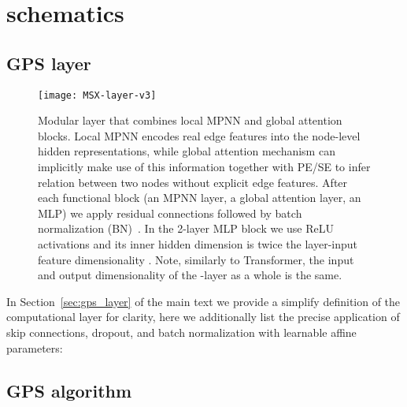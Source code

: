 \documentclass{article}
\begin{document}
\clearpage
\section{\method schematics}
\label{app:GPS-layer}
\setcounter{figure}{0}
\setcounter{table}{0}


\subsection{GPS layer}

\begin{figure}[ht]
  \centering
  \texttt{[image: MSX-layer-v3]}
  \caption{Modular \method layer that combines local MPNN and global attention blocks. Local MPNN encodes real edge features into the node-level hidden representations, while global attention mechanism can implicitly make use of this information together with PE/SE to infer relation between two nodes without explicit edge features. After each functional block (an MPNN layer, a global attention layer, an MLP) we apply residual connections followed by batch normalization (BN)~\cite{ioffe2015batchnorm}. In the 2-layer MLP block we use ReLU activations and its inner hidden dimension is twice the layer-input feature dimensionality . Note, similarly to Transformer, the input and output dimensionality of the \method-layer as a whole is the same.
  }
  \label{fig:gps_layer}
\end{figure}

\newcommand{\drp}{\texttt{Dropout}\xspace}
\newcommand{\bn}{\texttt{BatchNorm}\xspace}
 In Section~\ref{sec:gps_layer} of the main text we provide a simplify definition of the \method computational layer for clarity, here we additionally list the precise application of skip connections, dropout, and batch normalization with learnable affine parameters:




\newpage
\subsection{GPS algorithm}

\newcommand{\nodeenc}{\texttt{NodeEncoder}\xspace}
\newcommand{\edgeenc}{\texttt{EdgeEncoder}\xspace}
\end{document}
